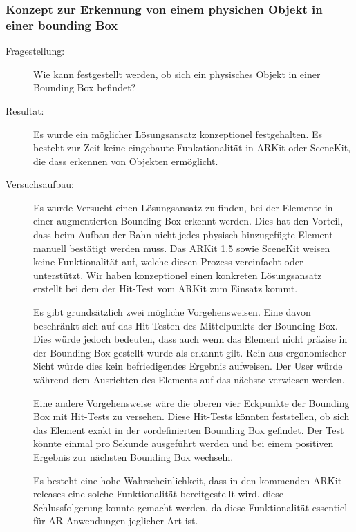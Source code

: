 \subsubsection{Konzept zur Erkennung von einem physichen Objekt in einer bounding Box}\label{subsub:prot-boundingbox}
\begin{description}
    \item[Fragestellung:] Wie kann festgestellt werden, ob sich ein physisches Objekt in einer Bounding Box befindet?
	\item[Resultat:] Es wurde ein möglicher Lösungsansatz konzeptionel festgehalten. Es besteht zur Zeit keine eingebaute Funkationalität in ARKit oder SceneKit, die dass erkennen von Objekten ermöglicht. 
    \item[Versuchsaufbau:] Es wurde Versucht einen Lösungsansatz zu finden, bei der Elemente in einer augmentierten Bounding Box erkennt werden. Dies hat den Vorteil, dass beim Aufbau der Bahn nicht jedes physisch hinzugefügte Element manuell bestätigt werden muss. 
    Das ARKit 1.5 sowie SceneKit weisen keine Funktionalität auf, welche diesen Prozess vereinfacht oder unterstützt. Wir haben konzeptionel einen konkreten Lösungsansatz erstellt bei dem der Hit-Test vom ARKit zum Einsatz kommt. 

    Es gibt grundsätzlich zwei mögliche Vorgehensweisen. Eine davon beschränkt sich auf das Hit-Testen des Mittelpunkts der Bounding Box. Dies würde jedoch bedeuten, dass auch wenn das Element nicht präzise in der Bounding Box gestellt wurde als erkannt gilt. Rein aus ergonomischer Sicht würde dies kein befriedigendes Ergebnis aufweisen. Der User würde während dem Ausrichten des Elements auf das nächste verwiesen werden. 
    
    Eine andere Vorgehensweise wäre die oberen vier Eckpunkte der Bounding Box mit Hit-Tests zu versehen. Diese Hit-Tests könnten feststellen, ob sich das Element exakt in der vordefinierten Bounding Box gefindet. Der Test könnte einmal pro Sekunde ausgeführt werden und bei einem positiven Ergebnis zur nächsten Bounding Box wechseln.

    Es besteht eine hohe Wahrscheinlichkeit, dass in den kommenden ARKit releases eine solche Funktionalität bereitgestellt wird. diese Schlussfolgerung konnte gemacht werden, da diese Funktionalität essentiel für AR Anwendungen jeglicher Art ist. 


\end{description}
